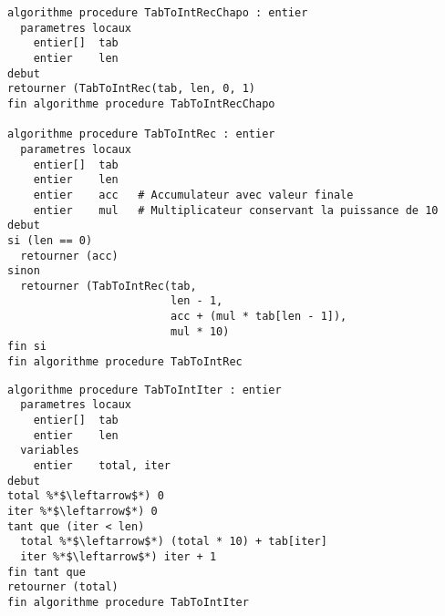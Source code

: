\documentclass[11pt,a4paper]{article}
\begin{document}
\begin{center}

\begin{lstlisting}[style=algorithmique]
algorithme procedure TabToIntRecChapo : entier
  parametres locaux
    entier[]  tab
    entier    len
debut
retourner (TabToIntRec(tab, len, 0, 1)
fin algorithme procedure TabToIntRecChapo

algorithme procedure TabToIntRec : entier
  parametres locaux
    entier[]  tab
    entier    len
    entier    acc   # Accumulateur avec valeur finale
    entier    mul   # Multiplicateur conservant la puissance de 10
debut
si (len == 0)
  retourner (acc)
sinon
  retourner (TabToIntRec(tab,
                         len - 1,
                         acc + (mul * tab[len - 1]),
                         mul * 10)
fin si
fin algorithme procedure TabToIntRec \end{lstlisting}


\begin{lstlisting}[style=algorithmique]
algorithme procedure TabToIntIter : entier
  parametres locaux
    entier[]  tab
    entier    len
  variables
    entier    total, iter
debut
total %*$\leftarrow$*) 0
iter %*$\leftarrow$*) 0
tant que (iter < len)
  total %*$\leftarrow$*) (total * 10) + tab[iter]
  iter %*$\leftarrow$*) iter + 1
fin tant que
retourner (total)
fin algorithme procedure TabToIntIter \end{lstlisting}


\end{center}
\end{document}
